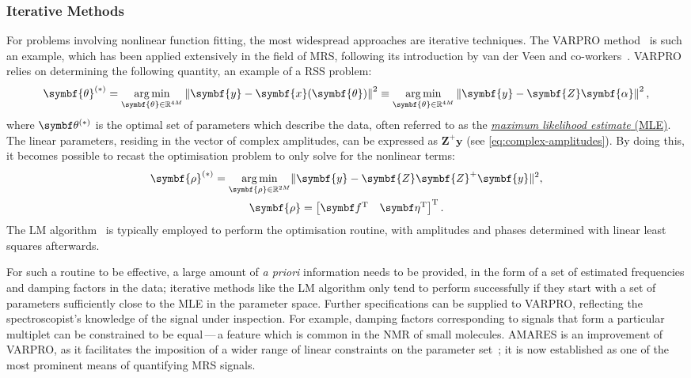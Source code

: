 \subsubsection{Iterative Methods}
For problems involving nonlinear function fitting, the most widespread approaches
are iterative techniques. The \ac{VARPRO} method~\cite{Golub1973} is such an
example, which has been applied extensively in the field of \ac{MRS}, following
its introduction by van der Veen and
co-workers~\cite{VanDerVeen1988,Decannierec1994}. \ac{VARPRO}
relies on determining the following quantity, an example of a \ac{RSS} problem:
\begin{equation}
    \symbf{\theta}^{(*)} = \argmin_{\symbf{\theta} \in \mathbb{R}^{4M}}
        \left \lVert \symbf{y} - \symbf{x}(\symbf{\theta}) \right \rVert^2 \equiv
        \argmin_{\symbf{\theta} \in \mathbb{R}^{4M}} \left \lVert \symbf{y} - \symbf{Z}\symbf{\alpha} \right \rVert^2,
\end{equation}
where $\bthstar$ is the optimal set of parameters which describe the data,
often referred to as the \ul{\emph{maximum likelihood estimate} (MLE)}.
The linear parameters, residing in the vector of complex amplitudes, can be
expressed as $\symbf{Z}^+\symbf{y}$ (see \cref{eq:complex-amplitudes}). By doing
this, it becomes possible to recast the optimisation problem to only solve for
the nonlinear terms:
\begin{subequations}
    \begin{gather}
        \symbf{\rho}^{(*)} =
            \argmin_{\symbf{\rho} \in \mathbb{R}^{2M}}
            \lVert \symbf{y} - \symbf{Z}\symbf{Z}^+\symbf{y} \rVert^2,\\
        \symbf{\rho} =
        \begin{bmatrix}
            \bdf\T & \bdeta\T
        \end{bmatrix}\T.
    \end{gather}
\end{subequations}
The \ac{LM} algorithm~\cite{Levenberg1944, Marquardt1963} is
typically employed to perform the optimisation routine, with amplitudes and
phases determined with linear least squares afterwards.

For such a routine to be effective, a large amount of \textit{a priori}
information needs to be provided, in the form of a set of estimated frequencies
and damping factors in the data; iterative methods like the \ac{LM} algorithm
only tend to perform successfully if they start with a set of parameters
sufficiently close to the \ac{MLE} in the parameter space.
Further specifications can be supplied to \ac{VARPRO}, reflecting the
spectroscopist's knowledge of the signal under inspection. For example, damping
factors corresponding to signals that form a particular multiplet can be
constrained to be equal\,---\,a feature which is common in the \ac{NMR} of
small molecules. \Ac{AMARES} is an improvement of \ac{VARPRO}, as it
facilitates the imposition of a wider range of linear constraints on the
parameter set~\cite{Vanhamme1997}; it is now established as one of the most
prominent means of quantifying \ac{MRS} signals.

